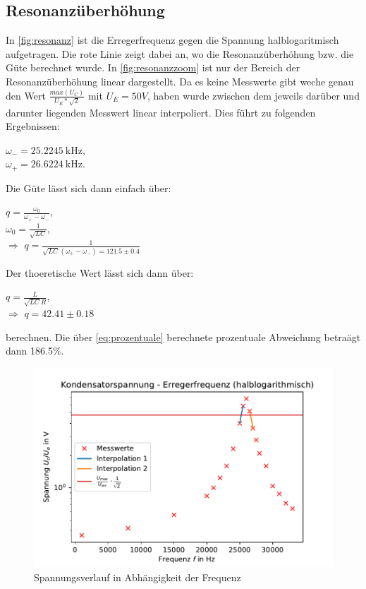   \subsection{Resonanzüberhöhung}
  \label{sec:res}
  In \autoref{fig:resonanz} ist die Erregerfrequenz gegen die Spannung halblogaritmisch aufgetragen.
  Die rote Linie zeigt dabei an, wo die Resonanzüberhöhung bzw. die Güte berechnet wurde. In
  \autoref{fig:resonanzzoom} ist nur der Bereich der Resonanzüberhöhung linear dargestellt. Da es keine
  Messwerte gibt weche genau den Wert $\frac{max(U_C)}{U_E*\sqrt{2}}$ mit $U_E=50V$, haben wurde zwischen
  dem jeweils darüber und darunter liegenden Messwert linear interpoliert. Dies führt zu folgenden Ergebnissen:
  \begin{center}
      $\omega_-=\SI[]{25,2245}[]{\kilo\hertz}$,\\
      $\omega_+=\SI[]{26,6224}[]{\kilo\hertz}$.\\
  \end{center}
  Die Güte lässt sich dann einfach über:
  \begin{center}
      $q=\frac{\omega_0}{\omega_+-\omega_-}$,\\
      $\omega_0=\frac{1}{\sqrt{LC}}$,\\
      $\Rightarrow$ $q=\frac{1}{\sqrt{LC}(\omega_+-\omega_-)=121.5\pm 0.4}$
  \end{center} 

  Der thoeretische Wert lässt sich dann über:
  \begin{center}
      $q=\frac{L}{\sqrt{LC}R}$,\\
      $\Rightarrow$  $q=42.41\pm 0.18$\\
  \end{center}
  berechnen. Die über \autoref{eq:prozentuale} berechnete prozentuale Abweichung betraägt dann 186.5\%.
  \begin{figure}
    \centering
    \includegraphics{frequenz.pdf}
    \caption{Spannungsverlauf in Abhängigkeit der Frequenz}
    \label{fig:resonanz}
  \end{figure}

